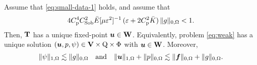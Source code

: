 \begin{theorem}\label{th:main-continuous}
Assume that \eqref{eq:small-data-1} holds, and assume that
\begin{equation}\label{eq:small-data-2}
4 C_{\mathrm{p}}^4 C_{\mathrm{Sob}}^2 \bar{E}[\mu \varepsilon^2]^{-1}\,(\varepsilon + 2 C_{\mathrm{p}}^2\bar{K} ) \,\|g\|_{0,\Omega} < 1.
\end{equation}
Then,   $\mathbf{T}$ has a unique fixed-point $\boldsymbol{u} \in \mathbf{W}$. Equivalently,   problem \eqref{eq:weak} has a unique solution $(\boldsymbol{u}, p, \psi) \in \mathbf{V} \times \mathrm{Q} \times \Phi$ with $\boldsymbol{u} \in \mathbf{W}$. Moreover, 
\begin{equation}\label{eq:stability}
\|\psi\|_{1,\Omega} \lesssim \|g\|_{0,\Omega} {\quad\hbox{and}\quad} \|\boldsymbol{u}\|_{1,\Omega} + \|p\|_{0,\Omega} \lesssim
  \|\boldsymbol{f}\|_{0,\Omega} + \| g\|_{0,\Omega}.
\end{equation}
\end{theorem}
